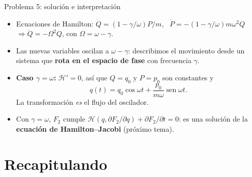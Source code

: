 \documentclass[spanish]{beamer}
\providecommand{\sen}{\operatorname{sen}}
\newcommand{\Ham}{\mathcal{H}}
\begin{document}
\begin{frame}{Problema 5: solución e interpretación}
\begin{itemize}
  \item<1-> Ecuaciones de Hamilton:
        $\dot Q = (1-\gamma/\omega)P/m$, \
        $\dot P = -(1-\gamma/\omega)m\omega^2 Q$
        $\Rightarrow \ddot Q = -\Omega^2 Q$, con $\Omega = \omega - \gamma$.
  \item<2-> Las nuevas variables oscilan a $\omega-\gamma$: describimos el movimiento
        desde un sistema que \textbf{rota en el espacio de fase} con frecuencia $\gamma$.
  \item<3-> \textbf{Caso $\gamma = \omega$:} $\Ham' = 0$, así que $Q = q_0$ y $P = p_0$
        son constantes y
        \[
          q(t) = q_0\cos\omega t + \frac{p_0}{m\omega}\sen\omega t .
        \]
        La transformación \emph{es} el flujo del oscilador.
  \item<4-> Con $\gamma=\omega$, $F_2$ cumple
        $\Ham\left(q,\partial F_2/\partial q\right) + \partial F_2/\partial t = 0$:
        es una solución de la \textbf{ecuación de Hamilton--Jacobi}
        (próximo tema).
\end{itemize}
\end{frame}

\section{Recapitulando}
\end{document}
